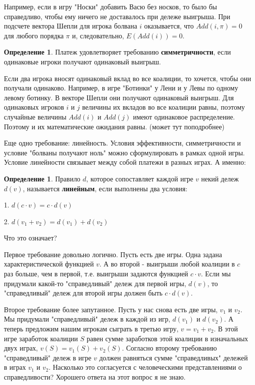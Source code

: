 \documentclass[pdftex,12pt,a4paper]{article}
\numberwithin{equation}{page} %
\theoremstyle{definition} %
\newtheorem{definition}[equation]{Определение}
\theoremstyle{definition}
\theoremstyle{definition}
\begin{document}
Например, если в игру "Носки" добавить Васю без носков, то было бы справедливо, чтобы ему ничего не доставалось при дележе выигрыша. При подсчете вектора Шепли для игрока болвана $i$ оказывается, что $Add(i,\pi)=0$ для любого порядка $\pi$ и, следовательно, $E(Add(i))=0$.

\begin{definition} Платеж удовлетворяет требованию \textbf{симметричности}, если одинаковые игроки получают одинаковый выигрыш.
\end{definition}
Если два игрока вносят одинаковый вклад во все коалиции, то хочется, чтобы они получали одинаково. Например, в игре "Ботинки" у Лени и у Левы по одному левому ботинку. В векторе Шепли они получают одинаковый выигрыш. Для одинаковых игроков $i$ и $j$ величины их вкладов во все коалиции равны, поэтому случайные величины $Add(i)$ и $Add(j)$ имеют одинаковое распределение. Поэтому и их математические ожидания равны.  (может тут поподробнее)

Еще одно требование: линейность. Условия эффективности, симметричности и условие "болваны получают ноль" можно сформулировать в рамках одной игры. Условие линейности связывает между собой платежи в разных играх. А именно:
\begin{definition}
Правило $d$, которое сопоставляет каждой игре $v$ некий дележ $d(v)$, называется \textbf{линейным}, если выполнены два условия:

1. $d(c\cdot v)=c\cdot d(v)$

2. $d(v_{1}+v_{2})=d(v_{1})+d(v_{2})$
\end{definition}

Что это означает? 

Первое требование довольно логично. Пусть есть две игры. Одна задана характеристической функцией $v$. А во второй - выигрыши любой коалиции в $c$ раз больше, чем в первой, т.е. выигрыши задаются функцией $c\cdot v$. Если мы придумали какой-то "справедливый" дележ для первой игры, $d(v)$, то "справедливый" дележ для второй игры должен быть $c\cdot d(v)$.

Второе требование более запутанное. Пусть у нас снова есть две игры, $v_{1}$ и $v_{2}$. Мы придумали "справедливый" дележ в каждой из игр, $d(v_{1})$ и $d(v_{2})$. А теперь предложим нашим игрокам сыграть в третью игру, $v=v_{1}+v_{2}$. В этой игре заработок коалиции $S$ равен сумме заработков этой коалиции в изначальных двух играх, $v(S)=v_{1}(S)+v_{2}(S)$. Согласно второму требованию "справедливый" дележ в игре $v$ должен равняться сумме "справедливых" дележей в играх $v_{1}$ и $v_{2}$. Насколько это согласуется с человеческими представлениями о справедливости? Хорошего ответа на этот вопрос я не знаю.
\end{document}
